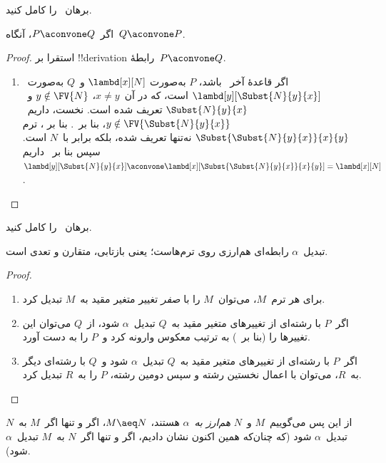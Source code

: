 \documentclass[../../../include/open-logic-section]{subfiles}
\begin{document}
\begin{prob}
  برهان~ را کامل کنید.
\end{prob}

\begin{lem}
  اگر~$P \aconvone Q$، آنگاه~$Q \aconvone P$.
\end{lem}

\begin{proof}
  استقرا بر !!{derivation} رابطهٔ~$P \aconvone Q$.
  \begin{enumerate}
  \item اگر قاعدهٔ آخر~ باشد، $P$ به‌صورت
    $\lambd[x][N]$ و~$Q$ به‌صورت~$\lambd[y][\Subst{N}{y}{x}]$ است،
    که در آن~$x \neq y$، $y \notin \FV{N}$ و~$\Subst{N}{y}{x}$ تعریف
    شده است. نخست، داریم~$y \notin
    \FV{\Subst{N}{y}{x}}$، بنا بر~. بنا بر
    ، ترم
    $\Subst{\Subst{N}{y}{x}}{x}{y}$ نه‌تنها تعریف شده، بلکه برابر
    با~$N$ است. سپس بنا بر~ داریم
    $\lambd[y][\Subst{N}{y}{x}]
    \aconvone \lambd[x][\Subst{\Subst{N}{y}{x}}{x}{y}] =
    \lambd[x][N]$.
  \end{enumerate}
\end{proof}

\begin{prob}
  برهان~ را کامل کنید.
\end{prob}

\begin{thm}
  تبدیل~$\alpha$ رابطه‌ای هم‌ارزی روی ترم‌هاست؛ یعنی بازتابی، متقارن و
  تعدی است.
\end{thm}

\begin{proof}
  \begin{enumerate}
  \item برای هر ترم~$M$، می‌توان~$M$ را با \emph{صفر} تغییر متغیر مقید
    به~$M$ تبدیل کرد.
  \item اگر~$P$ با رشته‌ای از تغییرهای متغیر مقید به~$Q$ تبدیل~$\alpha$
    شود، از~$Q$ می‌توان این تغییرها را (بنا بر~) به ترتیب
    معکوس وارونه کرد و~$P$ را به دست آورد.
  \item اگر~$P$ با رشته‌ای از تغییرهای متغیر مقید به~$Q$ تبدیل~$\alpha$
    شود و~$Q$ با رشته‌ای دیگر به~$R$، می‌توان با اعمال نخستین رشته و سپس
    دومین رشته، $P$ را به~$R$ تبدیل کرد.
  \end{enumerate}
\end{proof}

از این پس می‌گوییم~$M$ و~$N$ \emph{هم‌ارز به~$\alpha$} هستند،
$M \aeq N$، اگر و تنها اگر~$M$ به~$N$ تبدیل~$\alpha$ شود (که چنان‌که
همین اکنون نشان دادیم، اگر و تنها اگر~$N$ به~$M$ تبدیل~$\alpha$ شود).
\end{document}
